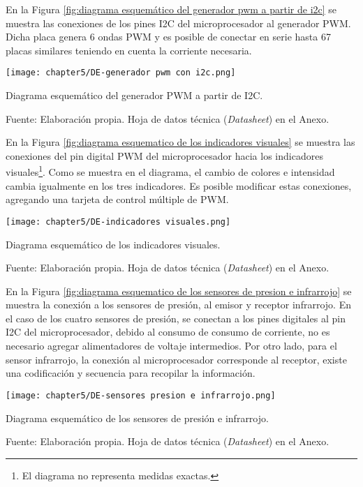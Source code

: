 En la Figura \ref{fig:diagrama esquemático del generador pwm a partir de i2c} se muestra las conexiones de los pines I2C del microprocesador al generador PWM. Dicha placa genera 6 ondas PWM y es posible de conectar en serie hasta 67 placas similares teniendo en cuenta la corriente necesaria.

\begin{myfigure}[H]
	\footnotesize\centering
	\texttt{[image: chapter5/DE-generador pwm con i2c.png]}
	\caption{Diagrama esquemático del generador PWM a partir de I2C.}
	\begin{myflushcenter}
		Fuente: Elaboración propia. Hoja de datos técnica (\textit{Datasheet}) en el Anexo.
	\end{myflushcenter}
	\label{fig:diagrama esquemático del generador pwm a partir de i2c}
\end{myfigure}

En la Figura \ref{fig:diagrama esquematico de los indicadores visuales} se muestra las conexiones del pin digital PWM del microprocesador hacia los indicadores visuales\footnote{El diagrama no representa medidas exactas.}. Como se muestra en el diagrama, el cambio de colores e intensidad cambia igualmente en los tres indicadores. Es posible modificar estas conexiones, agregando una tarjeta de control múltiple de PWM.

\begin{myfigure}[H]
	\footnotesize\centering
	\texttt{[image: chapter5/DE-indicadores visuales.png]}
	\caption{Diagrama esquemático de los indicadores visuales.}
	\begin{myflushcenter}
		Fuente: Elaboración propia. Hoja de datos técnica (\textit{Datasheet}) en el Anexo.
	\end{myflushcenter}
	\label{fig:diagrama esquematico de los indicadores visuales}
\end{myfigure}

En la Figura \ref{fig:diagrama esquematico de los sensores de presion e infrarrojo} se muestra la conexión a los sensores de presión, al emisor y receptor infrarrojo. En el caso de los cuatro sensores de presión, se conectan a los pines digitales al pin I2C del microprocesador, debido al consumo de consumo de corriente, no es necesario agregar alimentadores de voltaje intermedios. Por otro lado, para el sensor infrarrojo, la conexión al microprocesador corresponde al receptor, existe una codificación y secuencia para recopilar la información.

\begin{myfigure}[H]
	\footnotesize\centering
	\texttt{[image: chapter5/DE-sensores presion e infrarrojo.png]}
	\caption{Diagrama esquemático de los sensores de presión e infrarrojo.}
	\begin{myflushcenter}
		Fuente: Elaboración propia. Hoja de datos técnica (\textit{Datasheet}) en el Anexo.
	\end{myflushcenter}
	\label{fig:diagrama esquematico de los sensores de presion e infrarrojo}
\end{myfigure}

